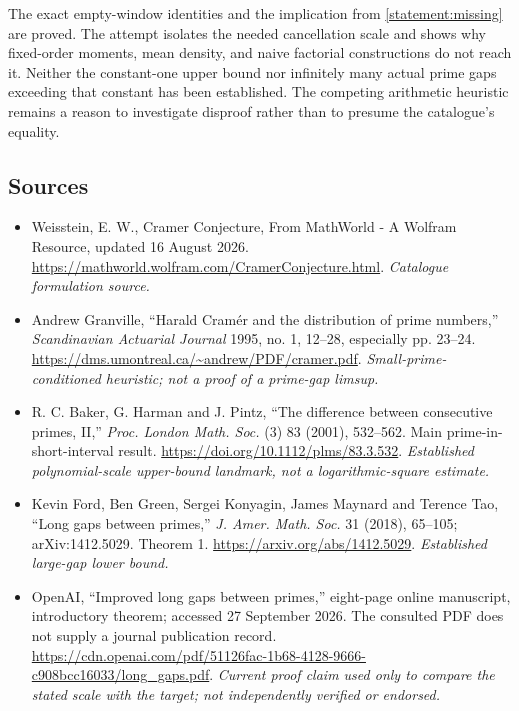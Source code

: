 \documentclass[11pt,a4paper]{article}
\numberwithin{equation}{section}
\begin{document}
The exact empty-window identities and the implication from
\eqref{statement:missing} are proved. The attempt isolates the needed
cancellation scale and shows why fixed-order moments, mean density, and
naive factorial constructions do not reach it. Neither the constant-one
upper bound nor infinitely many actual prime gaps exceeding that constant
has been established. The competing arithmetic heuristic remains a reason
to investigate disproof rather than to presume the catalogue's equality.

\subsection{Sources}
\begin{itemize}\raggedright
\item[\textnormal{[S1]}]\hypertarget{source:statement:1}{} Weisstein, E. W., Cramer Conjecture, From MathWorld - A Wolfram Resource, updated 16 August 2026.
\url{https://mathworld.wolfram.com/CramerConjecture.html}.
{\small\textit{Catalogue formulation source.}}
\item[\textnormal{[E1]}]\hypertarget{extra:statement:1}{} Andrew Granville, ``Harald Cram\'er and the distribution of prime numbers,'' \emph{Scandinavian Actuarial Journal} 1995, no. 1, 12--28, especially pp. 23--24.
\url{https://dms.umontreal.ca/~andrew/PDF/cramer.pdf}.
{\small\textit{Small-prime-conditioned heuristic; not a proof of a prime-gap limsup.}}
\item[\textnormal{[E2]}]\hypertarget{extra:statement:2}{} R. C. Baker, G. Harman and J. Pintz, ``The difference between consecutive primes, II,'' \emph{Proc. London Math. Soc.} (3) 83 (2001), 532--562. Main prime-in-short-interval result.
\url{https://doi.org/10.1112/plms/83.3.532}.
{\small\textit{Established polynomial-scale upper-bound landmark, not a logarithmic-square estimate.}}
\item[\textnormal{[E3]}]\hypertarget{extra:statement:3}{} Kevin Ford, Ben Green, Sergei Konyagin, James Maynard and Terence Tao, ``Long gaps between primes,'' \emph{J. Amer. Math. Soc.} 31 (2018), 65--105; arXiv:1412.5029. Theorem 1.
\url{https://arxiv.org/abs/1412.5029}.
{\small\textit{Established large-gap lower bound.}}
\item[\textnormal{[E4]}]\hypertarget{extra:statement:4}{} OpenAI, ``Improved long gaps between primes,'' eight-page online manuscript, introductory theorem; accessed 27 September 2026. The consulted PDF does not supply a journal publication record.
\url{https://cdn.openai.com/pdf/51126fac-1b68-4128-9666-c908bcc16033/long_gaps.pdf}.
{\small\textit{Current proof claim used only to compare the stated scale with the target; not independently verified or endorsed.}}
\end{itemize}
\end{document}

